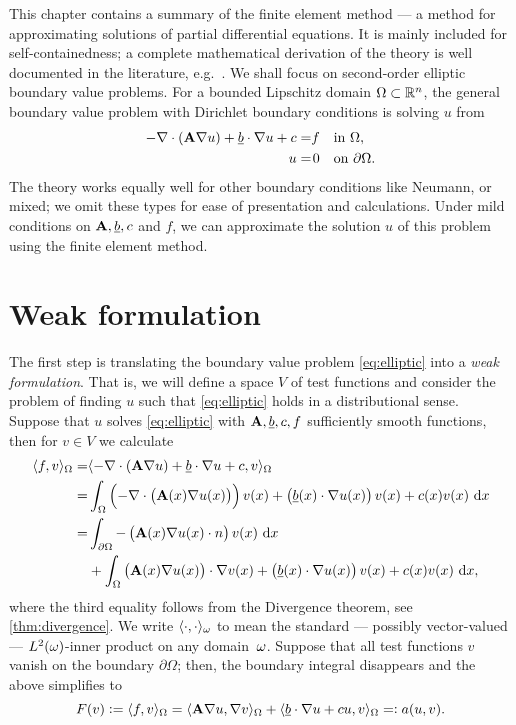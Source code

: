 \documentclass[thesis.tex]{subfiles}
\begin{document}
This chapter contains a summary of the finite element method ---
a method for approximating solutions of partial differential equations.
It is mainly included for self-containedness;
a complete mathematical derivation of the theory is well documented in the literature, e.g.~\cite{brenner, zienkiewicz1977finite}.
We shall focus on second-order elliptic boundary value problems. For a bounded Lipschitz domain $\Omega \subset \mathbb{R}^n$, the 
general boundary value problem with Dirichlet boundary conditions is solving $u$ from
\begin{equation}
  \label{eq:elliptic}
  \begin{alignedat}{2}
    -\nabla \cdot {\left(\mathbf{A} \nabla u\right)} + \underline{b} \cdot \nabla u + c &= &f \quad  &\text {in } \Omega,  \\
  u  &=& 0 \quad &\text{on } \partial\Omega.
  \end{alignedat}
\end{equation}
The theory works equally well for other boundary conditions like Neumann, or mixed; we omit
these types for ease of presentation and calculations. Under mild conditions on $\mathbf{A},\underline{b}, c$ 
and $f$, we can approximate the solution $u$ of this problem using the finite element method.

\section{Weak formulation}
The first step is translating the boundary value problem \eqref{eq:elliptic} into a \emph{weak formulation}.  
That is, we will define a space $V$ of test functions and consider the problem of finding $u$ such that \eqref{eq:elliptic} holds 
in a distributional sense. Suppose that $u$ solves \eqref{eq:elliptic} with $\mathbf{A}, \underline{b}, c, f$ sufficiently smooth functions, then for  $v \in V$  we calculate
\begin{align*}
  \ip{f,v}_{\O} = &\ip{-\nabla \cdot {\left(\mathbf{A} \nabla u\right)} + \v{b} \cdot \nabla u + c, v}_{\O} \\
  = &\int_\Omega \left( -\nabla \cdot {\left(\mathbf{A}(x) \nabla u(x)\right)}\right)v(x) + \left(\v{b}(x) \cdot \nabla u(x)\right)v(x) + c(x) v(x) \, \dif x\\
  = &\int_{\partial \Omega} -\left(\mathbf{A}(x) \nabla u(x) \cdot n\right)v(x) \, \dif x \\
  &+ \int_{\Omega} \left( \mathbf{A}(x) \nabla u(x)\right) \cdot \nabla v(x) + \left(\v{b}(x) \cdot \nabla u(x)\right)v(x) + c(x) v(x) \, \dif x,
\end{align*}
where the third equality follows from the Divergence theorem, see \ref{thm:divergence}. We write $\langle \cdot, \cdot \rangle_{\omega}$ to mean
the standard --- possibly vector-valued --- $L^2(\omega)$-inner product on any domain~$\omega$. Suppose that all test functions $v$ vanish on the boundary $\partial \Omega$; then, the boundary integral disappears and the above simplifies to
\begin{equation}
  \label{eq:ellipticweak}
  F(v) := \langle f,v \rangle_\Omega = \langle \mathbf{A} \nabla u, \nabla v \rangle_\Omega + \langle \underline{b} \cdot \nabla u + cu, v \rangle_\Omega=: a(u,v).
\end{equation}
\end{document}
